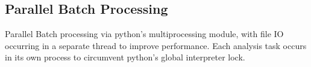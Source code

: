 \subsection{Parallel Batch Processing}
\label{sec:parallel}

Parallel Batch processing via python's multiprocessing module, with file IO occurring in a separate thread to improve performance.  Each analysis task occurs in its own process to circumvent python's global interpreter lock.
